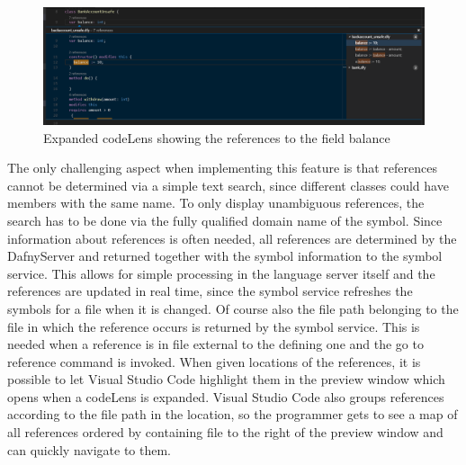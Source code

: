 \begin{figure}[H]
	\centering
	\includegraphics[width=1\textwidth]{img/codelensesExpanded}
	\caption{Expanded codeLens showing the references to the field balance}
	\label{fig:codelensesexpanded}
\end{figure}
The only challenging aspect when implementing this feature is that references cannot be determined via a simple text search, since different classes could have members with the same name. To only display unambiguous references, the search has to be done via the fully qualified domain name of the symbol. Since information about references is often needed, all references are determined by the DafnyServer and returned together with the symbol information to the symbol service. This allows for simple processing in the language server itself and the references are updated in real time, since the symbol service refreshes the symbols for a file when it is changed. Of course also the file path belonging to the file in which the reference occurs is returned by the symbol service. This is needed when a reference is in  file external to the defining one and the go to reference command is invoked.\newline
When given locations of the references, it is possible to let Visual Studio Code highlight them in the preview window which opens when a codeLens is expanded. Visual Studio Code also groups references according to the file path in the location, so the programmer gets to see a map of all references ordered by containing file to the right of the preview window and can quickly navigate to them.
